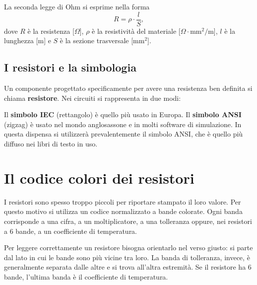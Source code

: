 La seconda legge di Ohm si esprime nella forma
\[
R = \rho \cdot \frac{l}{S},
\]
dove \(R\) è la resistenza [\(\Omega\)], \(\rho\) è la resistività del materiale [\(\Omega \cdot \text{mm}^2/\text{m}\)], \(l\) è la lunghezza [\(\text{m}\)] e \(S\) è la sezione trasversale [\(\text{mm}^2\)].

\subsection{I resistori e la simbologia}

Un componente progettato specificamente per avere una resistenza ben definita si chiama \textbf{resistore}. Nei circuiti si rappresenta in due modi:

\begin{figure}[htbp]
\centering
{}
\end{figure}

\begin{attenzione}
Il \textbf{simbolo IEC} (rettangolo) è quello più usato in Europa. Il \textbf{simbolo ANSI} (zigzag) è usato nel mondo anglosassone e in molti software di simulazione. In questa dispensa si utilizzerà prevalentemente il simbolo ANSI, che è quello più diffuso nei libri di testo in uso.
\end{attenzione}





\section{Il codice colori dei resistori}

I resistori sono spesso troppo piccoli per riportare stampato il loro valore. Per questo motivo si utilizza un codice normalizzato a bande colorate. Ogni banda corrisponde a una cifra, a un moltiplicatore, a una tolleranza oppure, nei resistori a 6 bande, a un coefficiente di temperatura.

Per leggere correttamente un resistore bisogna orientarlo nel verso giusto: si parte dal lato in cui le bande sono più vicine tra loro. La banda di tolleranza, invece, è generalmente separata dalle altre e si trova all'altra estremità. Se il resistore ha 6 bande, l'ultima banda è il coefficiente di temperatura.

